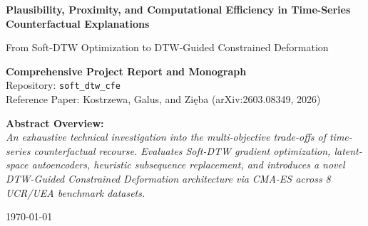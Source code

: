 \documentclass[11pt,a4paper]{report}
\begin{document}
\begin{titlepage}
    \centering
    \vspace*{1.5cm}
    
    {\Huge \bfseries Plausibility, Proximity, and Computational Efficiency in Time-Series Counterfactual Explanations\par}
    \vspace{0.8cm}
    {\LARGE From Soft-DTW Optimization to DTW-Guided Constrained Deformation\par}
    
    \vspace{2.0cm}
    
    {\Large \textbf{Comprehensive Project Report and Monograph}}\\[0.5cm]
    {\large Repository: \texttt{soft\_dtw\_cfe}}\\[0.3cm]
    {\large Reference Paper: Kostrzewa, Galus, and Zięba (arXiv:2603.08349, 2026)}\par
    
    \vfill
    
    \begin{minipage}{0.8\textwidth}
        \centering
        \textbf{Abstract Overview:}\\
        \textit{An exhaustive technical investigation into the multi-objective trade-offs of time-series counterfactual recourse. Evaluates Soft-DTW gradient optimization, latent-space autoencoders, heuristic subsequence replacement, and introduces a novel DTW-Guided Constrained Deformation architecture via CMA-ES across 8 UCR/UEA benchmark datasets.}
    \end{minipage}
    
    \vspace{1.5cm}
    {\large \today}\par
\end{titlepage}


\tableofcontents
\newpage
\listoffigures
\newpage
\listoftables
\newpage


\end{document}
